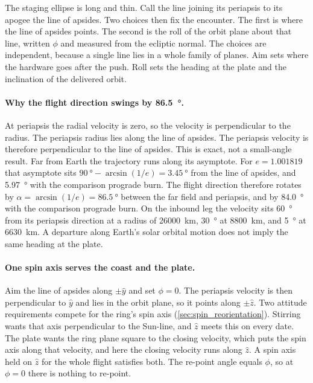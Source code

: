 \documentclass{article}
\begin{document}
The staging ellipse is long and thin. Call the line joining its periapsis to its apogee the line of apsides. Two choices then fix the encounter. The first is where the line of apsides points. The second is the roll of the orbit plane about that line, written $\phi$ and measured from the ecliptic normal. The choices are independent, because a single line lies in a whole family of planes. Aim sets where the hardware goes after the push. Roll sets the heading at the plate and the inclination of the delivered orbit.

\paragraph{Why the flight direction swings by \SI{86.5}{\degree}.}
At periapsis the radial velocity is zero, so the velocity is perpendicular to the radius. The periapsis radius lies along the line of apsides. The periapsis velocity is therefore perpendicular to the line of apsides. This is exact, not a small-angle result. Far from Earth the trajectory runs along its asymptote. For $e = \num{1.001819}$ that asymptote sits $\SI{90}{\degree} - \arcsin(1/e) = \SI{3.45}{\degree}$ from the line of apsides, and \SI{5.97}{\degree} with the comparison prograde burn. The flight direction therefore rotates by $\alpha = \arcsin(1/e) = \SI{86.5}{\degree}$ between the far field and periapsis, and by \SI{84.0}{\degree} with the comparison prograde burn. On the inbound leg the velocity sits \SI{60}{\degree} from its periapsis direction at a radius of \SI{26000}{\kilo\meter}, \SI{30}{\degree} at \SI{8800}{\kilo\meter}, and \SI{5}{\degree} at \SI{6630}{\kilo\meter}. A departure along Earth's solar orbital motion does not imply the same heading at the plate.

\paragraph{One spin axis serves the coast and the plate.}
Aim the line of apsides along $\pm\hat{y}$ and set $\phi = 0$. The periapsis velocity is then perpendicular to $\hat{y}$ and lies in the orbit plane, so it points along $\pm\hat{z}$. Two attitude requirements compete for the ring's spin axis (\autoref{sec:spin_reorientation}). Stirring wants that axis perpendicular to the Sun-line, and $\hat{z}$ meets this on every date. The plate wants the ring plane square to the closing velocity, which puts the spin axis along that velocity, and here the closing velocity runs along $\hat{z}$. A spin axis held on $\hat{z}$ for the whole flight satisfies both. The re-point angle equals $\phi$, so at $\phi = 0$ there is nothing to re-point.
\end{document}
